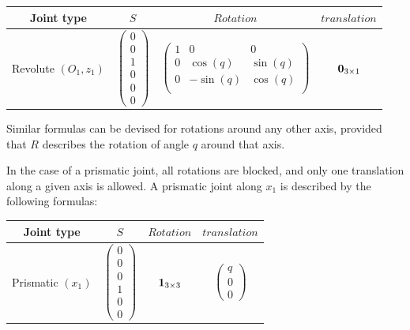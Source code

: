 \begin{table} [ht]
\centering
\begin{tabular}{cccc}
  \toprule
  Joint type & $S$ & $Rotation$ & $translation$ \\
  \midrule
  Revolute $(O_1,z_1)$
  &
  $\begin{pmatrix}
    0 \\ 0 \\ 1 \\ 0 \\ 0 \\ 0
  \end{pmatrix}$
  &
  $\begin{pmatrix}
    1 & 0 & 0 \\
    0 & \cos (q) & \sin (q) \\
    0 & -\sin (q) & \cos (q) \\
  \end{pmatrix}$
  &
  ${\bf 0}_{3\times1}$
  \\
  \bottomrule
\end{tabular}
\end{table}

Similar formulas can be devised for rotations around any other axis, provided that $R$ describes the rotation of angle $q$ around that axis.

In the case of a prismatic joint, all rotations are blocked, and only one translation along a given axis is allowed.
A prismatic joint along $x_1$ is described by the following formulas:

\begin{table} [ht]
\centering
\begin{tabular}{cccc}
  \toprule
  Joint type & $S$ & $Rotation$ & $translation$ \\
  \midrule
  Prismatic $(x_1)$
  &
  $\begin{pmatrix}
    0 \\ 0 \\ 0 \\ 1 \\ 0 \\ 0
  \end{pmatrix}$
  &
  ${\bf 1}_{3\times3} $
  &
  $\begin{pmatrix}
    q \\ 0 \\ 0
  \end{pmatrix}$
  \\
  \bottomrule
\end{tabular}
\end{table}

